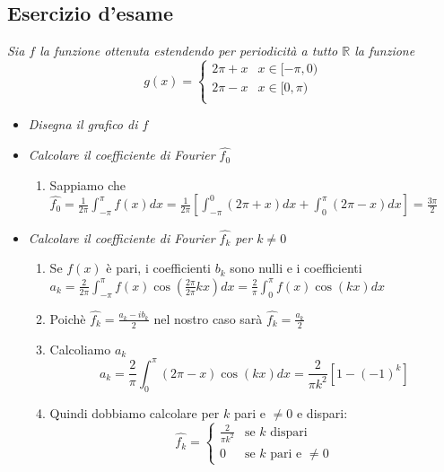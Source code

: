 \documentclass[10pt, a4paper]{article}
\begin{document}
    \subsection{Esercizio d'esame}
    \textit{Sia $f$ la funzione ottenuta estendendo per periodicità a tutto $\mathbb{R}$ la funzione} \begin{equation*}
        g(x)=\begin{cases}
            2\pi + x & x\in[-\pi,0)\\
            2\pi - x & x\in[0,\pi)\\
        \end{cases}
    \end{equation*}
    \begin{itemize}
        \item \textit{Disegna il grafico di $f$}
        \item \textit{Calcolare il coefficiente di Fourier $\hat{f_0}$} \begin{enumerate}
            \item Sappiamo che $\hat{f_0}=\frac{1}{2\pi}\int_{-\pi}^{\pi}f(x)dx=\frac{1}{2\pi}\left[\int_{-\pi}^{0}(2\pi+x)dx+\int_{0}^{\pi}(2\pi-x)dx\right]=\frac{3\pi}{2}$
        \end{enumerate}
        \item \textit{Calcolare il coefficiente di Fourier $\hat{f_k}$ per $k\neq 0$} \begin{enumerate}
            \item Se $f(x)$ è pari, i coefficienti $b_k$ sono nulli e i coefficienti $a_k=\frac{2}{2\pi}\int_{-\pi}^{\pi}f(x)\cos(\frac{2\pi}{2\pi}kx)dx=\frac{2}{\pi}\int_{0}^{\pi}f(x)\cos(kx)dx$
            \item Poichè $\hat{f_k}=\frac{a_k-ib_k}{2}$ nel nostro caso sarà $\hat{f_k}=\frac{a_k}{2}$
            \item Calcoliamo $a_k$ \begin{equation*}
                a_k = \frac{2}{\pi}\int_{0}^{\pi}(2\pi-x)\cos(kx)dx=\frac{2}{\pi k^2}[1-(-1)^k]
            \end{equation*}
            \item Quindi dobbiamo calcolare per $k$ pari e $\neq 0$ e dispari: \begin{equation*}
                \hat{f_k}=\begin{cases}
                    \frac{2}{\pi k^2} & \text{se } k \text{ dispari}\\
                    0 & \text{se } k \text{ pari e } \neq 0
                \end{cases}

\end{equation*}
\end{enumerate}
\end{itemize}
\end{document}
